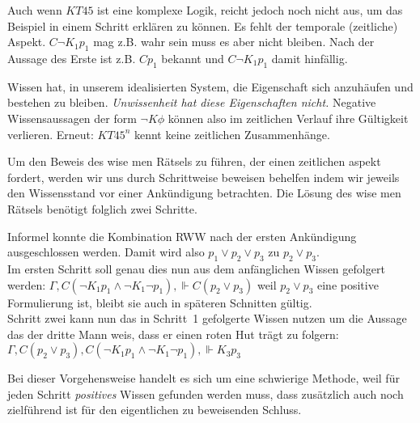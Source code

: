 Auch wenn $KT45$ ist eine komplexe Logik, reicht jedoch noch nicht aus, um das Beispiel in einem Schritt erklären zu können.
Es fehlt der temporale (zeitliche) Aspekt.
$C \neg K_1 p_1$ mag z.B. wahr sein muss es aber nicht bleiben.
Nach der Aussage des Erste ist z.B. $C p_1$ bekannt und $C \neg K_1 p_1$ damit hinfällig.

Wissen hat, in unserem idealisierten System, die Eigenschaft sich anzuhäufen und bestehen zu bleiben. 
\emph{Unwissenheit hat diese Eigenschaften nicht.}
Negative Wissensaussagen der form $\neg K \phi$ können also im zeitlichen Verlauf ihre Gültigkeit verlieren.
Erneut: $KT45^n$ kennt keine zeitlichen Zusammenhänge.

Um den Beweis des wise men Rätsels zu führen, der einen zeitlichen aspekt fordert, werden wir uns durch Schrittweise beweisen behelfen indem wir jeweils den Wissensstand vor einer Ankündigung betrachten.
Die Lösung des wise men Rätsels benötigt folglich zwei Schritte.

Informel konnte die Kombination RWW nach der ersten Ankündigung ausgeschlossen werden.
Damit wird also $p_1 \vee p_2 \vee p_3$ zu $p_2 \vee p_3$.\\
Im ersten Schritt soll genau dies nun aus dem anfänglichen Wissen gefolgert werden:
$\Gamma, C(\neg K_1 p_1 \wedge \neg K_1 \neg p_1), \Vdash C(p_2 \vee p_3)$
weil $p_2 \vee p_3$ eine positive Formulierung ist, bleibt sie auch in späteren Schnitten gültig.\\
Schritt zwei kann nun das in Schritt~1 gefolgerte Wissen nutzen um die Aussage das der dritte Mann weis, dass er einen roten Hut trägt zu folgern:
$\Gamma, C(p_2 \vee p_3), C(\neg K_1 p_1 \wedge \neg K_1 \neg p_1), \Vdash K_3 p_3$

Bei dieser Vorgehensweise handelt es sich um eine schwierige Methode, weil für jeden Schritt \emph{positives} Wissen gefunden werden muss, dass zusätzlich auch noch zielführend ist für den eigentlichen zu beweisenden Schluss.









